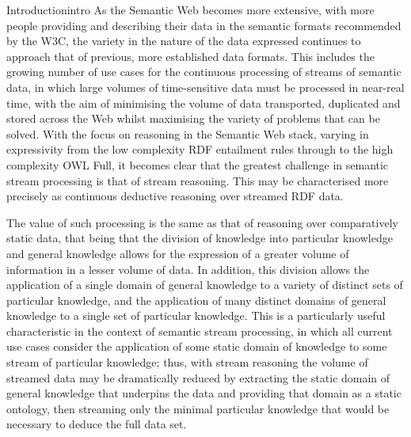 \begin{nestedsection}{Introduction}{intro}
	As the Semantic Web becomes more extensive, with more people providing and describing their data in the semantic formats recommended by the W3C, the variety in the nature of the data expressed continues to approach that of previous, more established data formats.
	This includes the growing number of use cases for the continuous processing of streams of semantic data, in which large volumes of time-sensitive data must be processed in near-real time, with the aim of minimising the volume of data transported, duplicated and stored across the Web whilst maximising the variety of problems that can be solved.
	With the focus on reasoning in the Semantic Web stack, varying in expressivity from the low complexity RDF entailment rules through to the high complexity OWL Full, it becomes clear that the greatest challenge in semantic stream processing is that of stream reasoning.
	This may be characterised more precisely as continuous deductive reasoning over streamed RDF data.
	
	The value of such processing is the same as that of reasoning over comparatively static data, that being that the division of knowledge into particular knowledge and general knowledge allows for the expression of a greater volume of information in a lesser volume of data.
	In addition, this division allows the application of a single domain of general knowledge to a variety of distinct sets of particular knowledge, and the application of many distinct domains of general knowledge to a single set of particular knowledge.
	This is a particularly useful characteristic in the context of semantic stream processing, in which all current use cases consider the application of some static domain of knowledge to some stream of particular knowledge;
	thus, with stream reasoning the volume of streamed data may be dramatically reduced by extracting the static domain of general knowledge that underpins the data and providing that domain as a static ontology, then streaming only the minimal particular knowledge that would be necessary to deduce the full data set.

\end{nestedsection}
